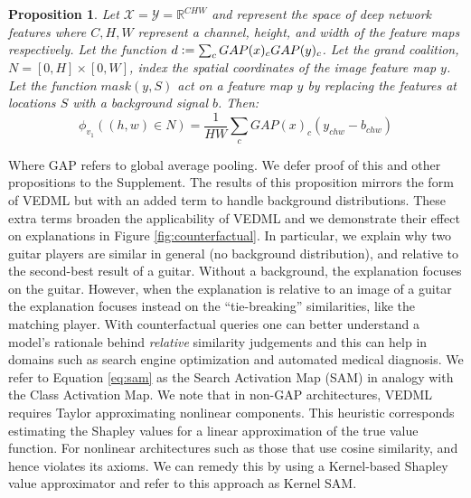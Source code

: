 \documentclass{article} %
\newtheorem{proposition}{Proposition}[section]
\newcommand{\defeq}{\vcentcolon=}
\begin{document}
\vspace{-.05in}
\begin{proposition}
\label{prop:cam}
 Let  $\mathcal{X} = \mathcal{Y} = \mathbb{R}^{CHW}$ and represent the space of deep network features where $C,H,W$ represent a channel, height, and width of the feature maps respectively. Let the function $d \defeq \sum_c GAP(x)_c GAP(y)_c$. Let the grand coalition, $N = [0,H] \times [0,W]$, index the spatial coordinates of the image feature map $y$. Let the function $mask(y, S)$ act on a feature map $y$ by replacing the features at locations $S$ with a background signal $b$. Then:
 \vspace{-.05in}
\begin{equation}
    \label{eq:sam}
    \phi_{v_1}((h,w) \in N) = \frac{1}{HW}\sum_c GAP(x)_c (y_{chw} - b_{chw})
\end{equation}
\end{proposition}
\vspace{-.05in}
Where GAP refers to global average pooling. We defer proof of this and other propositions to the Supplement. The results of this proposition mirrors the form of VEDML but with an added term to handle background distributions. These extra terms broaden the applicability of VEDML and we demonstrate their effect on explanations in Figure \ref{fig:counterfactual}. In particular, we explain why two guitar players are similar in general (no background distribution), and relative to the second-best result of a guitar. Without a background, the explanation focuses on the guitar. However, when the explanation is relative to an image of a guitar the explanation focuses instead on the ``tie-breaking'' similarities, like the matching player. With counterfactual queries one can better understand a model's rationale behind \textit{relative} similarity judgements and this can help in domains such as search engine optimization and automated medical diagnosis. We refer to Equation \ref{eq:sam} as the Search Activation Map (SAM) in analogy with the Class Activation Map. We note that in non-GAP architectures, VEDML requires Taylor approximating nonlinear components. This heuristic corresponds estimating the Shapley values for a linear approximation of the true value function. For nonlinear architectures such as those that use cosine similarity,  and hence violates its axioms. We can remedy this by using a Kernel-based Shapley value approximator \citep{shap} and refer to this approach as Kernel SAM.   
\end{document}
